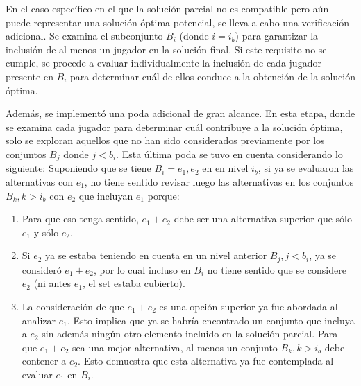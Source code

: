 En el caso específico en el que la solución parcial no es compatible pero aún puede representar una solución óptima potencial, se lleva a cabo una verificación adicional. Se examina el subconjunto $B_i$ (donde $i=i_b$) para garantizar la inclusión de al menos un jugador en la solución final. Si este requisito no se cumple, se procede a evaluar individualmente la inclusión de cada jugador presente en $B_i$ para determinar cuál de ellos conduce a la obtención de la solución óptima.


Además, se implementó una poda adicional de gran alcance. En esta etapa, donde se examina cada jugador para determinar cuál contribuye a la solución óptima, solo se exploran aquellos que no han sido considerados previamente por los conjuntos $B_j$ donde $j<b_i$.
Esta última poda se tuvo en cuenta considerando lo siguiente:
Suponiendo que se tiene $B_i={e_1, e_2}$ en en nivel $i_b$, si ya se evaluaron las alternativas con $e_1$, no tiene sentido revisar luego las alternativas en los conjuntos $B_k, k>i_b$ con $e_2$ que incluyan $e_1$ porque:
\begin{enumerate}
    \item Para que eso tenga sentido, $e_1+e_2$ debe ser una alternativa superior que sólo $e_1$ y sólo $e_2$.
    \item Si $e_2$ ya se estaba teniendo en cuenta en un nivel anterior $B_j, j<b_i$, ya se consideró $e_1+e_2$, por lo cual incluso en $B_i$ no tiene sentido que se considere $e_2$ (ni antes $e_1$, el set estaba cubierto).
    \item La consideración de que $e_1+e_2$ es una opción superior ya fue abordada al analizar $e_1$. Esto implica que ya se habría encontrado un conjunto que incluya a $e_2$ sin además ningún otro elemento incluido en la solución parcial. Para que $e_1+e_2$ sea una mejor alternativa, al menos un conjunto $B_k, k>i_b$ debe contener a $e_2$. Esto demuestra que esta alternativa ya fue contemplada al evaluar $e_1$ en $B_i$.
\end{enumerate}


